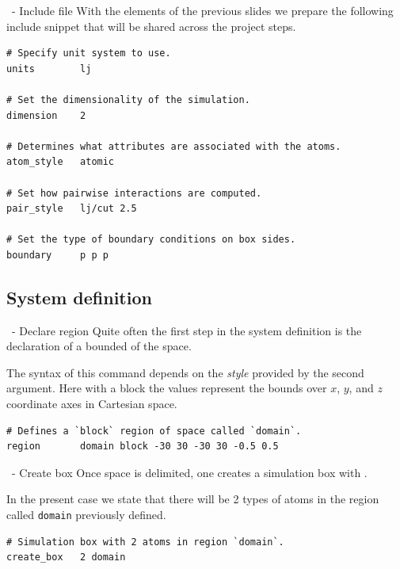 \begin{frame}[fragile]{\secname}{\subsecname\ - Include file}
With the elements of the previous slides we prepare the following include snippet that will be shared across the project steps.

\vspace{0.5cm}

\begin{lstlisting}[language=LAMMPS,basicstyle=\tiny]
# Specify unit system to use.
units        lj

# Set the dimensionality of the simulation.
dimension    2

# Determines what attributes are associated with the atoms.
atom_style   atomic

# Set how pairwise interactions are computed.
pair_style   lj/cut 2.5

# Set the type of boundary conditions on box sides.
boundary     p p p
\end{lstlisting}
\end{frame}

\subsection{System definition}

\begin{frame}[fragile]{\secname}{\subsecname\ - Declare region}
Quite often the first step in the system definition is the declaration of a bounded  of the space.

\vspace{0.5cm}

The syntax of this command depends on the \emph{style} provided by the second argument. Here with a block the values represent the bounds over $x$, $y$, and $z$ coordinate axes in Cartesian space.

\vspace{0.5cm}

\begin{lstlisting}[language=LAMMPS,basicstyle=\small]
# Defines a `block` region of space called `domain`.
region       domain block -30 30 -30 30 -0.5 0.5
\end{lstlisting}
\end{frame}

\begin{frame}[fragile]{\secname}{\subsecname\ - Create box}
Once space is delimited, one creates a simulation box with .

\vspace{0.5cm}

In the present case we state that there will be 2 types of atoms in the region called \Verb|domain| previously defined.

\vspace{0.5cm}

\begin{lstlisting}[language=LAMMPS,basicstyle=\small]
# Simulation box with 2 atoms in region `domain`.
create_box   2 domain
\end{lstlisting}
\end{frame}

